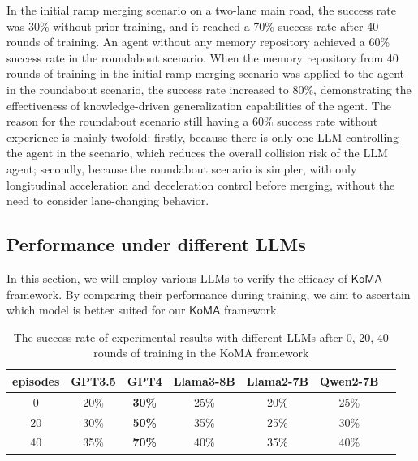 \documentclass[lettersize,journal]{IEEEtran}
\begin{document}
In the initial ramp merging scenario on a two-lane main road, the success rate was 30\% without prior training, and it reached a 70\% success rate after 40 rounds of training. An agent without any memory repository achieved a 60\% success rate in the roundabout scenario. When the memory repository from 40 rounds of training in the initial ramp merging scenario was applied to the agent in the roundabout scenario, the success rate increased to 80\%, demonstrating the effectiveness of knowledge-driven generalization capabilities of the agent. The reason for the roundabout scenario still having a 60\% success rate without experience is mainly twofold: firstly, because there is only one LLM controlling the agent in the scenario, which reduces the overall collision risk of the LLM agent; secondly, because the roundabout scenario is simpler, with only longitudinal acceleration and deceleration control before merging, without the need to consider lane-changing behavior.

\subsection{Performance under different LLMs}
In this section, we will employ various LLMs to verify the efficacy of $\mathsf{KoMA}$ framework. By comparing their performance during training, we aim to ascertain which model is better suited for our $\mathsf{KoMA}$ framework.

\begin{table}[h]
\caption{The success rate of experimental results with different LLMs after 0, 20, 40 rounds of training in the KoMA framework\label{tab:table4}}
\centering
\begin{tabular}{|c||c||c||c||c||c||c|}
\hline
\textbf{episodes} & \textbf{GPT3.5} & \textbf{GPT4} & \textbf{Llama3-8B} & \textbf{Llama2-7B} & \textbf{Qwen2-7B}\\
\hline
0 & 20\% & \textbf{30\%} & 25\% & 20\% & 25\%\\
\hline
20 & 30\% & \textbf{50\%} & 35\% & 25\% & 30\%\\
\hline
40 & 35\% & \textbf{70\%} & 40\% & 35\% & 40\%\\
\hline
\end{tabular}
\end{table}
\end{document}
